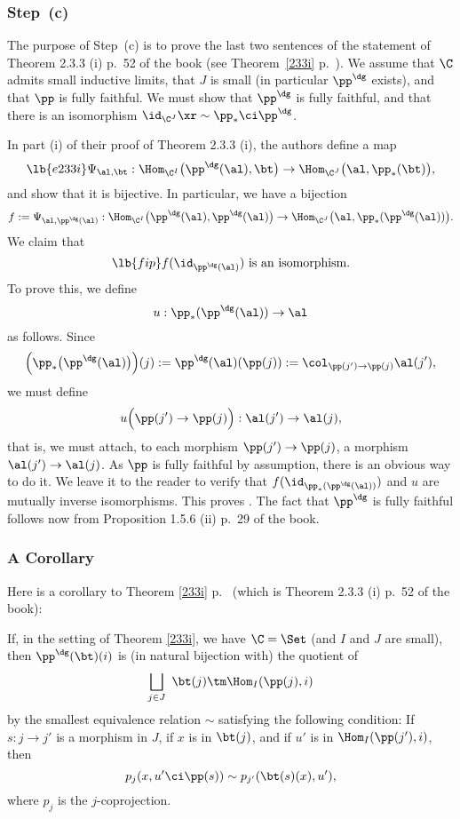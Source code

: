 \documentclass[12pt]{article}
\theoremstyle{remark}
\theoremstyle{definition}
\begin{document}
\subsubsection{Step~(c)}

The purpose of Step~(c) is to prove the last two sentences of the statement of Theorem 2.3.3 (i) p.~52 of the book (see Theorem~\ref{233i} p.~). We assume that $\C$ admits small inductive limits, that $J$ is small (in particular $\pp^\dg$ exists), and that $\pp$ is fully faithful. We must show that $\pp^\dg$ is fully faithful, and that there is an isomorphism $\id_{\C^J}\xr\sim\pp_*\ci\pp^\dg$. 

In part (i) of their proof of Theorem 2.3.3 (i), the authors define a map 
%
\begin{equation}\lb{e233i} 
%
\Psi_{\al,\bt}:
\Hom_{\C^I}\big(\pp^\dg(\al),\bt\big)\to
\Hom_{\C^J}\big(\al,\pp_*(\bt)\big),
%
\end{equation} 
%
and show that it is bijective. In particular, we have a bijection 
$$
f:=\Psi_{\al,\pp^\dg(\al)}:
\Hom_{\C^I}\big(\pp^\dg(\al),\pp^\dg(\al)\big)\to
\Hom_{\C^J}\big(\al,\pp_*(\pp^\dg(\al))\big).
$$ 
We claim that 
\begin{equation}\lb{fip}
f(\id_{\pp^\dg(\al)})\text{ is an isomorphism.}
\end{equation}
To prove this, we define 
$$
u:\pp_*(\pp^\dg(\al))\to\al
$$
as follows. Since 
$$ 
\Big(\pp_*\big(\pp^\dg(\al)\big)\Big)(j):=\pp^\dg(\al)(\pp(j)):=\col_{\pp(j')\to\pp(j)}\al(j'),
$$
we must define 
$$
u\Big(\pp(j')\to\pp(j)\Big):\al(j')\to\al(j),
$$
that is, we must attach, to each morphism $\pp(j')\to\pp(j)$, a morphism $\al(j')\to\al(j)$. As $\pp$ is fully faithful by assumption, there is an obvious way to do it. We leave it to the reader to verify that $f(\id_{\pp_*(\pp^\dg(\al))})$ and $u$ are mutually inverse isomorphisms. This proves . The fact that $\pp^\dg$ is fully faithful follows now from Proposition 1.5.6 (ii) p.~29 of the book.


\subsubsection{A Corollary}

Here is a corollary to Theorem \ref{233i} p.~ (which is Theorem 2.3.3 (i) p.~52 of the book):

\begin{cor}
If, in the setting of Theorem \ref{233i}, we have $\C=\Set$ (and $I$ and $J$ are small), then $\pp^\dg(\bt)(i)$ is (in natural bijection with) the quotient of 
$$
\bigsqcup_{j\in J}\ \bt(j)\tm\Hom_I(\pp(j),i) 
$$ 
by the smallest equivalence relation $\sim$ satisfying the following condition: If $s:j\to j'$ is a morphism in $J$, if $x$ is in $\bt(j)$, and if $u'$ is in $\Hom_I(\pp(j'),i)$, then 
$$
p_j(x,u'\ci\pp(s))\sim p_{j'}(\bt(s)(x),u'),
$$ 
where $p_j$ is the $j$-coprojection. 
\end{cor}
\end{document}

